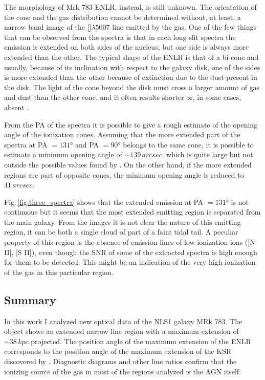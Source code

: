 \documentclass[../thesis.tex]{subfiles}
\begin{document}
The morphology of Mrk 783 ENLR, instead, is still unknown.
The orientation of the cone and the gas distribution cannot be determined without, at least, a narrow band image of the []$\lambda5007$ line emitted by the gas.
One of the few things that can be observed from the spectra is that in each long slit spectra the emission is extended on both sides of the nucleus, but one side is always more extended than the other.
The typical shape of the ENLR is that of a bi-cone \citep{Pogge88,Schmitt94,Fischer13} and usually, because of its inclination with respect to the galaxy disk, one of the sides is more extended than the other because of extinction due to the dust present in the disk.
The light of the cone beyond the disk must cross a larger amount of gas and dust than the other cone, and it often results shorter \citep[e.g. NGC 5643][]{Simpson97} or, in some cases, absent \citep{Wilson96}.

From the PA of the spectra it is possible to give a rough estimate of the opening angle of the ionization cones.
Assuming that the more extended part of the spectra at PA $=\ang{131}$ and PA $=\ang{90}$ belongs to the same cone, it is possible to estimate a minimum opening angle of $\sim 139\,\si{arcsec}$, which is quite large but not outside the possible values found by \citet{He18}.
On the other hand, if the more extended regions are part of opposite cones, the minimum opening angle is reduced to $41\,\si{arcsec}$.

Fig.\,\ref{fig:three_spectra} shows that the extended emission at PA $=\ang{131}$ is not continuous but it seems that the most extended emitting region is separated from the main galaxy.
From the images it is not clear the nature of this emitting region, it can be both a single cloud of part of a faint tidal tail.
A peculiar property of this region is the absence of emission lines of low ionization ions ([N II], [S II]), even though the SNR of some of the extracted spectra is high enough for them to be detected.
This might be an indication of the very high ionization of the gas in this particular region.


\subsection{Summary}
\label{sec:pap3_summary}

In this work I analyzed new optical data of the NLS1 galaxy MRk 783.
The object shows an extended narrow line region with a maximum extension of $\sim 38\,\si{kpc}$ projected.
The position angle of the maximum extension of the ENLR corresponds to the position angle of the maximum extension of the KSR discovered by \citet{Congiu17}.
Diagnostic diagrams and other line ratios confirm that the ionizing source of the gas in most of the regions analyzed is the AGN itself.
\end{document}
